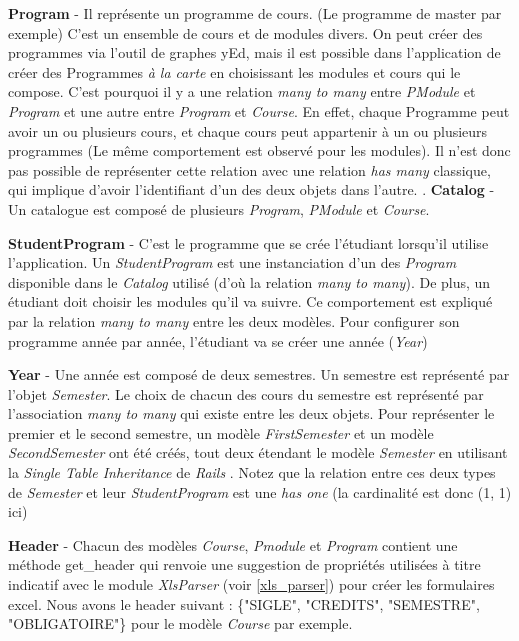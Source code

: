 \textbf{Program} - Il représente un programme de cours. (Le programme de master par exemple) C'est un ensemble de cours et de modules divers. On peut créer des programmes via l'outil de graphes yEd, mais il est possible dans l'application de créer des Programmes \textit{à la carte} en choisissant les modules et cours qui le compose. C'est pourquoi il y a une relation \textit{many to many} entre \textit{PModule} et \textit{Program} et une autre entre \textit{Program} et \textit{Course}. En effet, chaque Programme peut avoir un ou plusieurs cours, et chaque cours peut appartenir à un ou plusieurs programmes (Le même comportement est observé pour les modules). Il n'est donc pas possible de représenter cette relation avec une relation \textit{has many} classique, qui implique d'avoir l'identifiant d'un des deux objets dans l'autre. \cite{active_record}. 
\textbf{Catalog} - Un catalogue est composé de plusieurs \textit{Program}, \textit{PModule} et \textit{Course}.

\textbf{StudentProgram} - C'est le programme que se crée l'étudiant lorsqu'il utilise l'application. Un \textit{StudentProgram} est une instanciation d'un des \textit{Program} disponible dans le \textit{Catalog} utilisé (d'où la relation \textit{many to many}). De plus, un étudiant doit choisir les modules qu'il va suivre. Ce comportement est expliqué par la relation \textit{many to many} entre les deux modèles. Pour configurer son programme année par année, l'étudiant va se créer une année (\textit{Year})

\textbf{Year} - Une année est composé de deux semestres. Un semestre est représenté par l'objet \textit{Semester}. Le choix de chacun des cours du semestre est représenté par l'association \textit{many to many} qui existe entre les deux objets. Pour représenter le premier et le second semestre, un modèle \textit{FirstSemester} et un modèle \textit{SecondSemester} ont été créés, tout deux étendant le modèle \textit{Semester} en utilisant la \textit{Single Table Inheritance} de \textit{Rails} \cite{STI}. Notez que la relation entre ces deux types de \textit{Semester} et leur \textit{StudentProgram} est une \textit{has one} (la cardinalité est donc (1, 1) ici)

\textbf{Header} - Chacun des modèles \textit{Course}, \textit{Pmodule} et \textit{Program} contient une méthode get\_header qui renvoie une suggestion de propriétés utilisées à titre indicatif avec le module \textit{XlsParser} (voir \ref{xls_parser}) pour créer les formulaires excel. Nous avons le header suivant : \{"SIGLE", "CREDITS", "SEMESTRE", "OBLIGATOIRE"\} pour le modèle \textit{Course} par exemple.  





